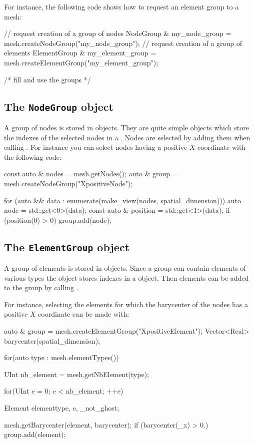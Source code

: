 For instance, the following code shows how to request
an element group to a mesh:

\begin{cpp}
  // request creation of a group of nodes
  NodeGroup & my_node_group = mesh.createNodeGroup("my_node_group");
  // request creation of a group of elements
  ElementGroup & my_element_group = mesh.createElementGroup("my_element_group");

  /* fill and use the groups */
\end{cpp}


\subsection{The \texttt{NodeGroup} object}
A group of nodes is stored in  objects.
They are quite simple objects which store the indexes
of the selected nodes in a .
Nodes are selected by adding them when calling
. For instance you can select nodes
having a positive $X$ coordinate with the following code:
\begin{cpp}
  const auto & nodes = mesh.getNodes();
  auto & group = mesh.createNodeGroup("XpositiveNode");

  for (auto && data : enumerate(make_view(nodes, spatial_dimension))){
    auto node = std::get<0>(data);
    const auto & position = std::get<1>(data);
    if (position(0) > 0) group.add(node);
  }
\end{cpp}

\subsection{The \texttt{ElementGroup} object}
A group of elements is stored in  objects.
Since a group can contain elements of various types
the  object stores indexes in
a  object.
Then elements can be added to the group by calling .

For instance, selecting the elements for which the barycenter of the nodes
has a positive $X$ coordinate can be made with:

\begin{cpp}
  auto & group = mesh.createElementGroup("XpositiveElement");
  Vector<Real> barycenter(spatial_dimension);

  for(auto type : mesh.elementTypes()){
    UInt nb_element  = mesh.getNbElement(type);

    for(UInt e = 0; e < nb_element; ++e) {
      Element element{type, e, _not_ghost};

      mesh.getBarycenter(element, barycenter);
      if (barycenter(_x) > 0.) group.add(element);
    }
  }
\end{cpp}



